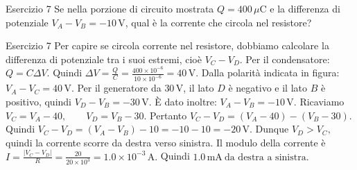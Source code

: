 \documentclass[a4paper]{article}
\begin{document}
\begin{snippetexercise}{Esercizio 7}
    Se nella porzione di circuito mostrata \(Q = 400\,\mu\mathrm{C}\) e la
    differenza di potenziale \(V_A - V_B = -10\,\mathrm{V}\), qual è la
    corrente che circola nel resistore?
    \begin{center}
    \end{center}

\end{snippetexercise}
\begin{snippetsolution}{Esercizio 7}
    Per capire se circola corrente nel resistore, dobbiamo calcolare la
    differenza di potenziale tra i suoi estremi, cioè \(V_C - V_D\).
    Per il condensatore:
    \(Q = C\Delta V.\)
    Quindi
    \(\Delta V = \frac{Q}{C} = \frac{400 \times 10^{-6}}{10 \times 10^{-6}} = 40\,\mathrm{V}.\)
    Dalla polarità indicata in figura:
    \(V_A - V_C = 40\,\mathrm{V}.\)
    Per il generatore da \(30\,\mathrm{V}\), il lato \(D\) è negativo e il lato
    \(B\) è positivo, quindi
    \(V_D - V_B = -30\,\mathrm{V}.\)
    È dato inoltre:
    \(V_A - V_B = -10\,\mathrm{V}.\)
    Ricaviamo
    \(V_C = V_A - 40, \qquad V_D = V_B - 30.\)
    Pertanto
    \(V_C - V_D = (V_A - 40) - (V_B - 30).\)
    Quindi
    \(V_C - V_D = (V_A - V_B) - 10 = -10 - 10 = -20\,\mathrm{V}.\)
    Dunque
    \(V_D > V_C,\)
    quindi la corrente scorre da destra verso sinistra.
    Il modulo della corrente è
    \(I = \frac{|V_C - V_D|}{R} = \frac{20}{20 \times 10^3} = 1.0 \times 10^{-3}\,\mathrm{A}.\)
    Quindi
    \(\boxed{1.0\,\mathrm{mA}\ \text{da destra a sinistra}}.\)
\end{snippetsolution}
\end{document}
